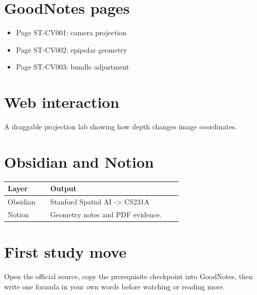 \documentclass[11pt]{article}
\begin{document}
\section*{GoodNotes pages}
\begin{itemize}[leftmargin=1.4em]
  \item Page ST-CV001: camera projection
  \item Page ST-CV002: epipolar geometry
  \item Page ST-CV003: bundle adjustment
\end{itemize}

\section*{Web interaction}
A draggable projection lab showing how depth changes image coordinates.

\section*{Obsidian and Notion}
\begin{tabular}{p{0.22\linewidth}p{0.68\linewidth}}
\toprule
Layer & Output \\
\midrule
Obsidian & Stanford Spatial AI -> CS231A \\
Notion & Geometry notes and PDF evidence. \\
\bottomrule
\end{tabular}

\section*{First study move}
Open the official source, copy the prerequisite checkpoint into GoodNotes, then write one formula in your own words before watching or reading more.
\end{document}
